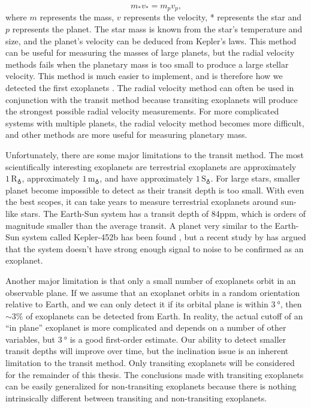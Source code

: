 \begin{equation}
    m_*v_*=m_pv_p,
\end{equation}
where $m$ represents the mass, $v$ represents the velocity, * represents the star
 and $p$ represents the planet. The star mass is known from the star's temperature
 and size, and the planet's velocity can be deduced from Kepler's laws. This
 method can be useful for measuring the masses of large planets, but the radial
 velocity methods fails when the planetary mass is too small to produce a large
 stellar velocity. This method is much easier to implement, and is therefore
 how we detected the first exoplanets \citep{firstradv}. The radial velocity method can
 often be used in conjunction with the transit method because transiting
 exoplanets will produce the strongest possible radial velocity measurements.
 For more complicated systems with multiple planets, the radial velocity method
 becomes more difficult, and other methods are more useful for measuring
 planetary mass.

Unfortunately, there are some major limitations to the transit method. The most
 scientifically interesting exoplanets are terrestrial exoplanets are approximately
 $1\,\mathrm{R}_\earth$, approximately $1\,\mathrm{m}_\earth$, and have
 approximately $1\,\mathrm{S}_\earth$. For large stars, smaller planet become
 impossible to detect as their transit depth is too small. With even the best
 scopes, it can take years to measure terrestrial exoplanets around sun-like
 stars. The Earth-Sun system has a transit depth of 84ppm, which is orders of
 magnitude smaller than the average transit. A planet very similar to the
 Earth-Sun system called Kepler-452b has been found \citep{kepler452b}, but a
 recent study by \citet{kepler452dispute} has argued that the system doesn't
 have strong enough signal to noise to be confirmed as an exoplanet.

Another major limitation is that only a small number of exoplanets orbit in an
 observable plane. If we assume that an exoplanet orbits in a random orientation
 relative to Earth, and we can only detect it if its orbital plane is within
 $\SI{3}{\degree}$, then $\sim3\%$ of exoplanets can be detected from Earth. In
 reality, the actual cutoff of an ``in plane'' exoplanet is more complicated and
 depends on a number of other variables, but $\SI{3}{\degree}$ is a good first-order
 estimate. Our ability to detect smaller transit depths will improve over time,
 but the inclination issue is an inherent limitation to the transit method. Only
 transiting exoplanets will be considered for the remainder of this thesis.
 The conclusions made with transiting exoplanets can be
 easily generalized for non-transiting exoplanets because there is nothing
 intrinsically different between transiting and non-transiting exoplanets.

